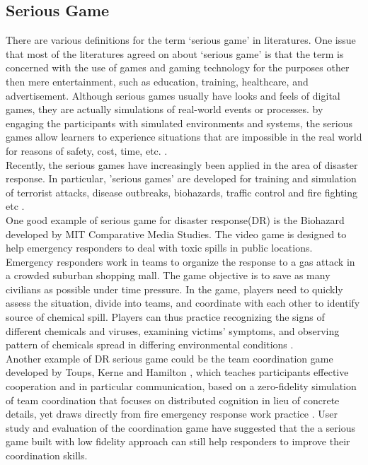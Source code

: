 \subsection{Serious Game}
There are various definitions for the term `serious game' in literatures. One issue that most of the literatures agreed on about `serious game' is that the term is concerned with the use of games and gaming technology for the purposes other then mere entertainment, such as education, training, healthcare, and advertisement. Although serious games usually have looks and feels of digital games, they are actually simulations of real-world events or processes. by engaging the participants with simulated environments and systems, the serious games allow learners to experience situations that are impossible in the real world for reasons of safety, cost, time, etc. \cite{Susi2007,Squire2003,Meesters2013}. \\

Recently, the serious games have increasingly been applied in the area of disaster response. In particular, 'serious games' are developed for training and simulation of terrorist attacks, disease outbreaks, biohazards, traffic control and fire fighting etc \cite{Susi2007,Squire2003}. \\

One good example of serious game for disaster response(DR) is the Biohazard developed by MIT Comparative Media Studies. The video game is designed to help emergency responders to deal with toxic spills in public locations. Emergency responders work in teams to organize the response to a gas attack in a crowded suburban shopping mall. The game objective is to save as many civilians as possible under time pressure. In the game,  players need to quickly assess the situation, divide into teams, and coordinate with each other to identify source of chemical spill. Players can thus practice recognizing the signs of different chemicals and viruses, examining victims' symptoms, and observing pattern of chemicals spread in differing environmental conditions \cite{Susi2007}.\\


Another example of DR serious game could be the team coordination game developed by Toups, Kerne and Hamilton \cite{Toups2011}, which teaches participants effective cooperation and in particular communication, based on a zero-fidelity simulation of team coordination that focuses on distributed cognition in lieu of concrete details, yet draws directly from fire emergency response work practice \cite{Toups2011}. User study and evaluation of the coordination game have suggested that the a serious game built with low fidelity approach can still help responders to improve their coordination skills.\\

